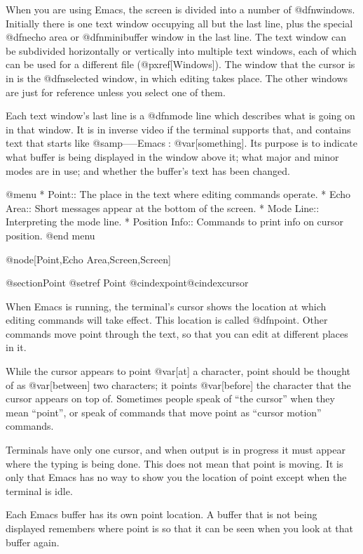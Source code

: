   When you are using Emacs, the screen is divided into a number of
@dfn{windows}.  Initially there is one text window occupying all but the
last line, plus the special @dfn{echo area} or @dfn{minibuffer window} in
the last line.  The text window can be subdivided horizontally or
vertically into multiple text windows, each of which can be used for a
different file (@pxref[Windows]).  The window that the cursor is in is the
@dfn{selected window}, in which editing takes place.  The other windows are
just for reference unless you select one of them.

  Each text window's last line is a @dfn{mode line} which describes what is
going on in that window.  It is in inverse video if the terminal supports that,
and contains text that starts like @samp{-----Emacs: @var[something]}.  Its purpose
is to indicate what buffer is being displayed in the window above
it; what major and minor modes are in use; and whether the buffer's text
has been changed.

@menu
* Point::	The place in the text where editing commands operate.
* Echo Area::   Short messages appear at the bottom of the screen.
* Mode Line::	Interpreting the mode line.
* Position Info:: Commands to print info on cursor position.
@end menu

@node[Point,Echo Area,Screen,Screen]

@section{Point}
@setref Point
@cindex{point}@cindex{cursor}

  When Emacs is running, the terminal's cursor shows the location at
which editing commands will take effect.  This location is called
@dfn{point}.  Other commands move point through the text, so that you
can edit at different places in it.

  While the cursor appears to point @var[at] a character, point should be
thought of as @var[between] two characters; it points @var[before] the
character that the cursor appears on top of.  Sometimes people speak of
``the cursor'' when they mean ``point'', or speak of commands that move
point as ``cursor motion'' commands.

  Terminals have only one cursor, and when output is in progress it must
appear where the typing is being done.  This does not mean that point is
moving.  It is only that Emacs has no way to show you the location of point
except when the terminal is idle.

  Each Emacs buffer has its own point location.  A buffer that is not being
displayed remembers where point is so that it can be seen when you look at
that buffer again.

